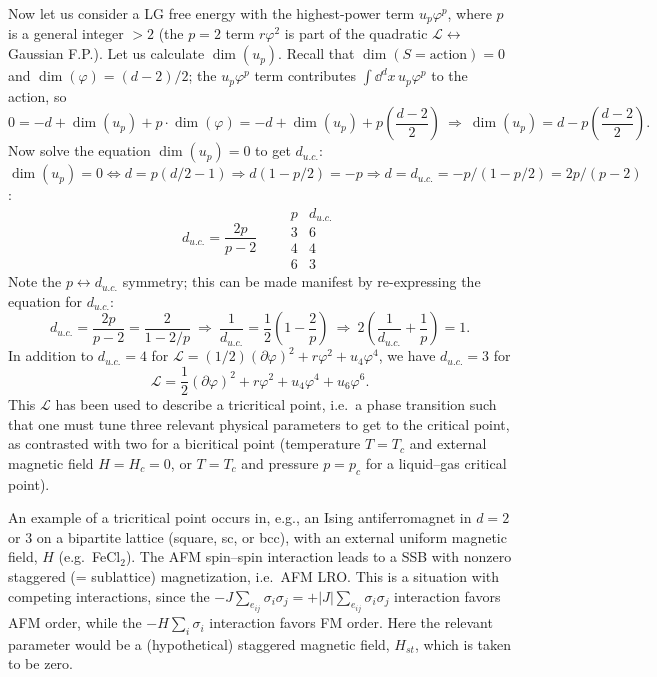 Now let us consider a LG free energy with the highest-power term $u_p\varphi^p$, where $p$ is a general integer
$>2$ (the $p = 2$ term $r\varphi^2$ is part of the quadratic $\mathcal L\leftrightarrow$ Gaussian F.P.). Let us
calculate $\dim(u_p)$. Recall that $\dim(S = \text{action}) = 0$ and $\dim(\varphi) = (d-2)/2$; the
$u_p\varphi^p$ term contributes $\int\dd^dx\,u_p\varphi^p$ to the action, so
\begin{equation}
  0 = -d + \dim(u_p) + p\cdot\dim(\varphi) = -d + \dim(u_p) + p\left(\frac{d-2}{2}\right)
  \ \Rightarrow\ \dim(u_p) = d - p\left(\frac{d-2}{2}\right).
\end{equation}
Now solve the equation $\dim(u_p) = 0$ to get $d_{u.c.}$:
$\dim(u_p) = 0\Leftrightarrow d = p\left(d/2-1\right)\Rightarrow d\left(1-p/2\right) = -p\Rightarrow
d = d_{u.c.} = -p/\left(1-p/2\right) = 2p/(p-2)$:
\begin{equation}
  \boxed{d_{u.c.} = \frac{2p}{p-2}}\qquad
  \begin{array}{c|c} p & d_{u.c.}\\ \hline 3 & 6\\ 4 & 4\\ 6 & 3\end{array}
\end{equation}
Note the $p\leftrightarrow d_{u.c.}$ symmetry; this can be made manifest by re-expressing the equation for
$d_{u.c.}$:
\begin{equation}
  d_{u.c.} = \frac{2p}{p-2} = \frac{2}{1-2/p}\ \Rightarrow\ \frac{1}{d_{u.c.}} = \frac{1}{2}\left(1-\frac{2}{p}\right)
  \ \Rightarrow\ \boxed{2\left(\frac{1}{d_{u.c.}}+\frac{1}{p}\right) = 1}.
\end{equation}
In addition to $d_{u.c.} = 4$ for $\mathcal L = (1/2)(\partial\varphi)^2 + r\varphi^2 + u_4\varphi^4$, we have
$d_{u.c.} = 3$ for
\begin{equation}
  \mathcal L = \frac{1}{2}(\partial\varphi)^2 + r\varphi^2 + u_4\varphi^4 + u_6\varphi^6 .
\end{equation}
This $\mathcal L$ has been used to describe a tricritical point, i.e.\ a phase transition such that one must tune
three relevant physical parameters to get to the critical point, as contrasted with two for a bicritical point
(temperature $T = T_c$ and external magnetic field $H = H_c = 0$, or $T = T_c$ and pressure $p = p_c$ for a
liquid--gas critical point).

An example of a tricritical point occurs in, e.g., an Ising antiferromagnet in $d = 2$ or 3 on a bipartite
lattice (square, sc, or bcc), with an external uniform magnetic field, $H$ (e.g.\ FeCl$_2$). The AFM spin--spin
interaction leads to a SSB with nonzero staggered (= sublattice) magnetization, i.e.\ AFM LRO. This is a
situation with competing interactions, since the
$-J\sum_{e_{ij}}\sigma_i\sigma_j = +|J|\sum_{e_{ij}}\sigma_i\sigma_j$ interaction favors AFM order, while the
$-H\sum_i\sigma_i$ interaction favors FM order. Here the relevant parameter would be a (hypothetical) staggered
magnetic field, $H_{st}$, which is taken to be zero.

